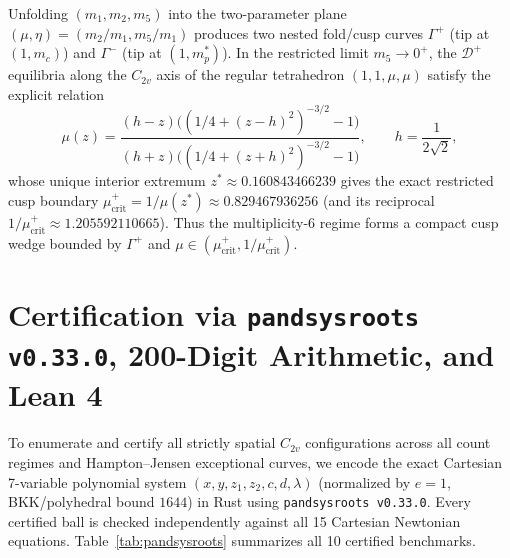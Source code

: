 \documentclass[11pt,a4paper]{amsart}
\theoremstyle{definition}
\theoremstyle{remark}
\begin{document}
Unfolding $(m_1, m_2, m_5)$ into the two-parameter plane $(\mu, \eta) = (m_2/m_1, m_5/m_1)$
produces two nested fold/cusp curves $\Gamma^+$ (tip at $(1, m_c)$) and $\Gamma^-$ (tip
at $(1, m_p^*)$).
In the restricted limit $m_5 \to 0^+$, the $\mathcal{D}^+$ equilibria along the $C_{2v}$
axis of the regular tetrahedron $(1, 1, \mu, \mu)$ satisfy the explicit relation
\[
  \mu(z) = \frac{(h - z)\bigl((1/4 + (z-h)^2)^{-3/2} - 1\bigr)}
                {(h + z)\bigl((1/4 + (z+h)^2)^{-3/2} - 1\bigr)},
  \qquad h = \frac{1}{2\sqrt{2}},
\]
whose unique interior extremum $z^* \approx 0.160843466239$ gives the exact restricted
cusp boundary $\mu_{\mathrm{crit}}^+ = 1/\mu(z^*) \approx 0.829467936256$ (and its
reciprocal $1/\mu_{\mathrm{crit}}^+ \approx 1.205592110665$).
Thus the multiplicity-6 regime forms a compact cusp wedge bounded by $\Gamma^+$ and
$\mu \in (\mu_{\mathrm{crit}}^+, 1/\mu_{\mathrm{crit}}^+)$.

\section{Certification via \texttt{pandsysroots v0.33.0}, 200-Digit Arithmetic, and Lean 4}

To enumerate and certify all strictly spatial $C_{2v}$ configurations across all count
regimes and Hampton--Jensen exceptional curves, we encode the exact Cartesian
7-variable polynomial system $(x, y, z_1, z_2, c, d, \lambda)$ (normalized by $e = 1$,
BKK/polyhedral bound $1644$) in Rust using \texttt{pandsysroots v0.33.0}.
Every certified ball is checked independently against all 15 Cartesian Newtonian
equations. Table~\ref{tab:pandsysroots} summarizes all 10 certified benchmarks.
\end{document}
